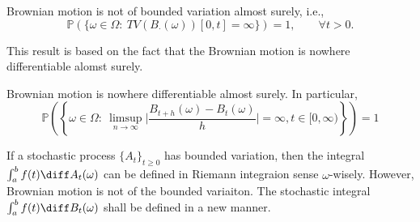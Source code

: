 \begin{theorem}\label{The:7:6}
Brownian motion is not of bounded variation almost surely, i.e.,
\[
\mathbb{P}(\{\omega\in\Omega:~
TV(B_{\cdot}(\omega))[0,t] = \infty
\})=1,\qquad \forall t>0.
\]
\end{theorem}
This result is based on the fact that the Brownian motion is nowhere differentiable alomst surely.
\begin{theorem}
Brownian motion is nowhere differentiable almost surely. In particular,
\[
\mathbb{P}\left(\left\{\omega\in\Omega:~
\limsup\limits_{n\to\infty}\bigg|
\frac{B_{t+h}(\omega) - B_t(\omega)}{h}
\bigg|
=\infty,
t\in[0,\infty)
\right\}\right)=1
\]
\end{theorem}
\begin{remark}
If a stochastic process $\{A_t\}_{t\ge0}$ has bounded variation, then the integral $\int_a^bf(t)\diff A_t(\omega)$ can be defined in Riemann integraion sense $\omega$-wisely.
However, Brownian motion is not of the bounded variaiton.
The stochastic integral $\int_a^bf(t)\diff B_t(\omega)$ shall be defined in a new manner.
\end{remark}
